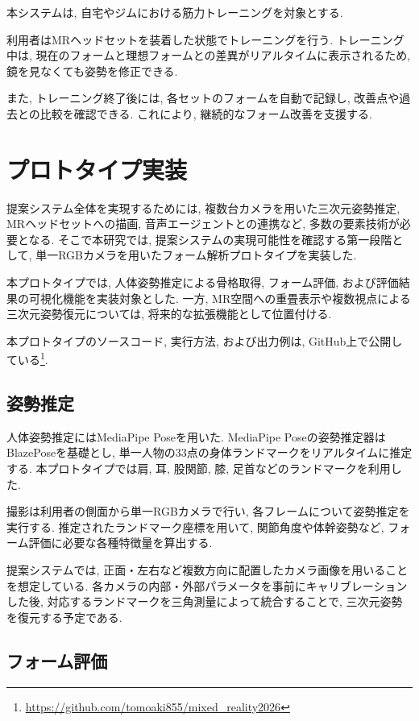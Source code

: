 \documentclass[a4paper,9pt,twocolumn]{jsarticle}
\begin{document}
本システムは, 自宅やジムにおける筋力トレーニングを対象とする. 

利用者はMRヘッドセットを装着した状態でトレーニングを行う. 
トレーニング中は, 現在のフォームと理想フォームとの差異がリアルタイムに表示されるため, 鏡を見なくても姿勢を修正できる. 

また, トレーニング終了後には, 各セットのフォームを自動で記録し, 改善点や過去との比較を確認できる. 
これにより, 継続的なフォーム改善を支援する. 

\section{プロトタイプ実装}

提案システム全体を実現するためには, 複数台カメラを用いた三次元姿勢推定, MRヘッドセットへの描画, 音声エージェントとの連携など, 多数の要素技術が必要となる. 
そこで本研究では, 提案システムの実現可能性を確認する第一段階として, 単一RGBカメラを用いたフォーム解析プロトタイプを実装した. 

本プロトタイプでは, 人体姿勢推定による骨格取得, フォーム評価, および評価結果の可視化機能を実装対象とした. 
一方, MR空間への重畳表示や複数視点による三次元姿勢復元については, 将来的な拡張機能として位置付ける. 

本プロトタイプのソースコード, 実行方法, および出力例は, 
GitHub上で公開している\footnote{
\url{https://github.com/tomoaki855/mixed_reality2026}
}. 

\subsection{姿勢推定}

人体姿勢推定にはMediaPipe Poseを用いた. 
MediaPipe Poseの姿勢推定器はBlazePoseを基礎とし, 単一人物の33点の身体ランドマークをリアルタイムに推定する\cite{mediapipe,blazepose}. 
本プロトタイプでは肩, 耳, 股関節, 膝, 足首などのランドマークを利用した. 

撮影は利用者の側面から単一RGBカメラで行い, 各フレームについて姿勢推定を実行する. 
推定されたランドマーク座標を用いて, 関節角度や体幹姿勢など, フォーム評価に必要な各種特徴量を算出する. 

提案システムでは, 正面・左右など複数方向に配置したカメラ画像を用いることを想定している. 
各カメラの内部・外部パラメータを事前にキャリブレーションした後, 対応するランドマークを三角測量によって統合することで, 三次元姿勢を復元する予定である. 

\subsection{フォーム評価}
\end{document}
